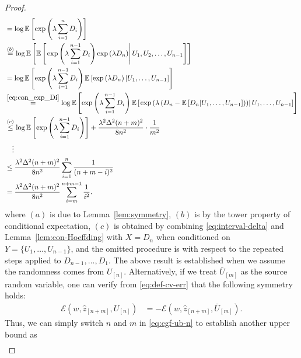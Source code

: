 \documentclass[onecolumn,romanappendices,10pt]{IEEEtran}
\newcommand{\Ecal}{{\mathcal E}}
\newcommand{\EE}{{\mathbb{E}}}
\begin{document}
\begin{proof}
\begin{equation}
\begin{aligned}
				&= \log \EE \left[ \exp \left( \lambda \sum_{i=1}^{n} D_i \right) \right] \\
				&\overset{(b)}{=} \log \EE \left[ \EE \left[ \left. \exp \left( \lambda \sum_{i=1}^{n-1} D_i \right) \exp \left( \lambda D_n \right) \right| U_1, U_2, \ldots, U_{n-1} \right] \right] \\
				&= \log \EE \left[ \exp \left( \lambda \sum_{i=1}^{n-1} D_i \right) \EE \left[ \exp \left( \lambda D_n \right) | U_1, \ldots, U_{n-1} \right] \right] \\
				&\overset{\eqref{eq:con_exp_Di}}{=} \log \EE \left[ \exp \left( \lambda \sum_{i=1}^{n-1} D_i \right) \EE \left[ \left. \exp \left( \lambda \left( D_n - \EE \left[ D_n | U_1, \ldots, U_{n-1} \right] \right) \right) \right| U_1, \ldots, U_{n-1} \right] \right] \\
				&\overset{(c)}{\leq} \log \EE \left[ \exp \left( \lambda \sum_{i=1}^{n-1} D_i \right) \right] + \frac{\lambda^2 \Delta^2 (n+m)^2}{8 n^2} \cdot \frac{1}{m^2} \\
				&\quad \vdots \\
				&\leq \frac{\lambda^2 \Delta^2 (n+m)^2}{8 n^2} \sum_{i=1}^{n} \frac{1}{(n+m-i)^2} \\
				&= \frac{\lambda^2 \Delta^2 (n+m)^2}{8 n^2} \sum_{i=m}^{n+m-1} \frac{1}{i^2}.
			\end{aligned}\label{eq:cgf-ub-n}
		\end{equation}
		where $(a)$ is due to Lemma~\ref{lem:symmetry}, $(b)$ is by the tower property of conditional expectation, $(c)$ is obtained by combining \eqref{eq:interval-delta} and Lemma~\eqref{lem:con-Hoeffding} with $X = D_n$ when conditioned on $Y = \{U_1, \ldots, U_{n-1}\}$, and the omitted procedure is with respect to the repeated steps applied to $D_{n-1}, \ldots, D_1$. The above result is established when we assume the randomness comes from $U_{[n]}$. Alternatively, if we treat $\bar{U}_{[m]}$ as the source random variable, one can verify from \eqref{eq:def-cv-err} that the following symmetry holds:
		\begin{equation}	
			\begin{aligned}
				\Ecal\left( w, \hat{z}_{[n+m]}, U_{[n]} \right) &= - \Ecal\left( w, \hat{z}_{[n+m]}, \bar{U}_{[m]} \right).
			\end{aligned}
		\end{equation}
		Thus, we can simply switch $n$ and $m$ in \eqref{eq:cgf-ub-n} to establish another upper bound as
		\begin{equation}	
			\begin{aligned}

\end{aligned}
\end{equation}
\end{proof}
\end{document}

